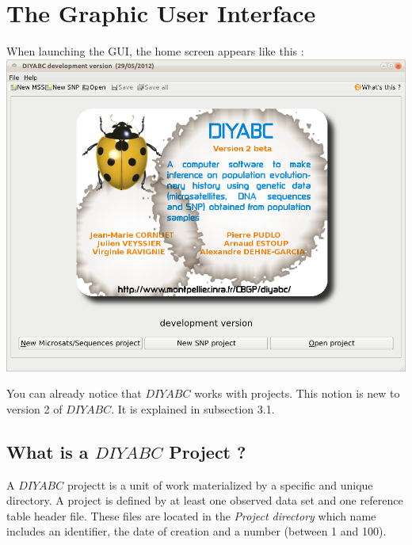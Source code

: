 \section{The Graphic User Interface}

When launching the GUI, the home screen appears like this :\\


\includegraphics[scale=0.4]{gui_pictures/Capture-DIYABC-1.png} 

You can already notice that $DIYABC$ works with projects. This notion is new to version 2 of $DIYABC$. It is explained in subsection 3.1.

\subsection{What is a $DIYABC$ Project ?}

\label{doc_openProjectButton}
A $ DIYABC $ projectt is a unit of work materialized by a specific and unique directory. A project is defined by at least one observed data set and one reference table header file. These files are located in the \emph{Project directory} which name includes an identifier, the date of creation and a number (between 1 and 100).\\

